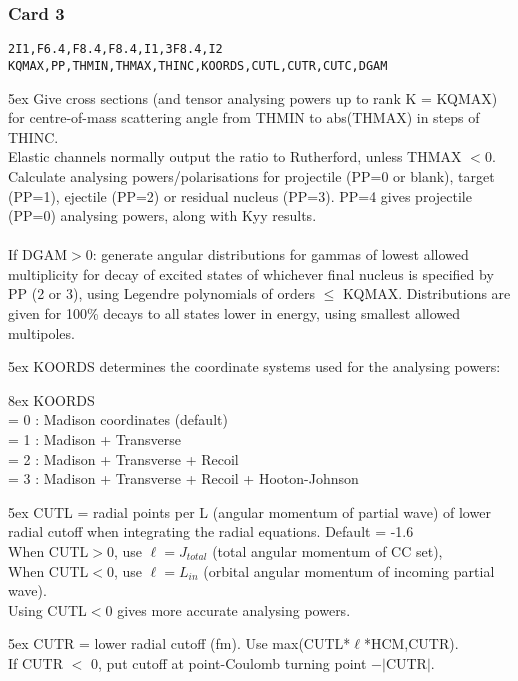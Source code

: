 \documentclass[11pt]{article}
\begin{document}
\subsubsection*{Card 3}
\begin{verbatim}
2I1,F6.4,F8.4,F8.4,I1,3F8.4,I2  
KQMAX,PP,THMIN,THMAX,THINC,KOORDS,CUTL,CUTR,CUTC,DGAM
\end{verbatim}


\hangindent 5ex
Give cross sections (and tensor analysing powers up to rank K = KQMAX)
for centre-of-mass scattering angle from THMIN
to abs(THMAX) in steps of THINC.\\
Elastic channels normally output the ratio to Rutherford, unless THMAX $< 0$.\\
Calculate analysing powers/polarisations for projectile (PP=0 or blank),
target (PP=1), ejectile (PP=2) or residual nucleus (PP=3).
PP=4 gives projectile (PP=0) analysing powers, along with Kyy results.
\\ ~\\
If DGAM$>$0:  generate angular distributions for gammas of lowest allowed multiplicity for decay
of excited states of whichever final nucleus is specified by PP (2 or 3),
using Legendre polynomials  of orders $\leq$ KQMAX. Distributions are given for 100\%
decays to all states lower in energy, using smallest allowed multipoles.

\hangindent 5ex
KOORDS determines the coordinate systems used for the analysing powers:

\hangindent 8ex  KOORDS
\\  = 0 : Madison coordinates (default)
\\  = 1 : Madison + Transverse
\\  = 2 : Madison + Transverse + Recoil
\\  = 3 : Madison + Transverse + Recoil + Hooton-Johnson



\hangindent 5ex
CUTL = radial points per L (angular momentum of partial wave)
of lower radial cutoff when integrating the radial equations. Default = -1.6\\
When CUTL$>$0, use $\ell=J_{total}$ (total angular momentum of CC set),\\
When CUTL$<$0, use $\ell=L_{in}$ (orbital angular momentum of incoming partial wave).\\
Using  CUTL$<$0 gives more accurate analysing powers.

\hangindent 5ex
CUTR = lower radial cutoff (fm).  Use max(CUTL*$\ell$*HCM,CUTR).\\
If CUTR $<$ 0, put cutoff at point-Coulomb turning point $- |$CUTR$|$.
\end{document}
